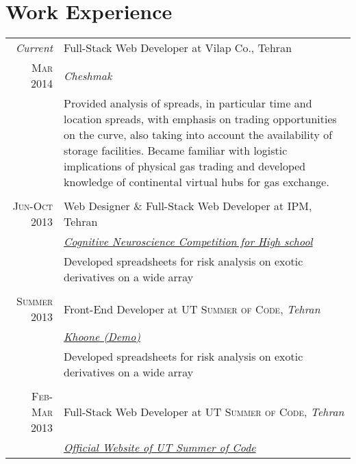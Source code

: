 \documentclass[a4paper,10pt]{article}
\begin{document}
\section{Work Experience}
\begin{tabular}{r|p{11cm}}
 \emph{Current} & Full-Stack Web Developer at Vilap Co., Tehran \\\textsc{Mar 2014}&\emph{Cheshmak}\\&\footnotesize{Provided analysis of spreads, in particular time and location spreads, with emphasis on trading opportunities on the curve, also taking into account the availability of storage facilities. Became familiar with logistic implications of physical gas trading and developed knowledge of continental virtual hubs for gas exchange.}\\\multicolumn{2}{c}{} \\
 \textsc{Jun-Oct 2013} & Web Designer \& Full-Stack Web Developer at \textsc{IPM}, Tehran \\&\emph{\href{http://cnch.ir}{Cognitive Neuroscience Competition for High school}}\\&\footnotesize{Developed spreadsheets for risk analysis on exotic derivatives on a wide array }\\\multicolumn{2}{c}{} \\
\textsc{Summer 2013} & Front-End Developer at \textsc{UT Summer of Code}, \emph{Tehran}\\&\emph{\href{http://cod3r.ir/demos/khoone}{Khoone (Demo)}}\\&\footnotesize{Developed spreadsheets for risk analysis on exotic derivatives on a wide array}\\\multicolumn{2}{c}{} \\
\textsc{Feb-Mar 2013} & Full-Stack Web Developer at \textsc{UT Summer of Code}, \emph{Tehran}\\&\emph{\href{http://summerofcode.ir}{Official Website of UT Summer of Code}}
\end{tabular}

\end{document}
